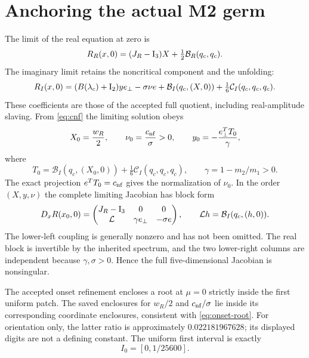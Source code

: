 \documentclass[11pt,a4paper]{article}
\numberwithin{equation}{section}
\begin{document}
\section{Anchoring the actual M2 germ}\label{sec:onset}
The limit of the real equation at zero is
\begin{equation}
R_R(x,0)=(J_R-\mathrm I_3)X+\tfrac12\mathcal B_R(q_c,q_c).\label{eq:onset-real}
\end{equation}
The imaginary limit retains the noncritical component and the unfolding:
\begin{equation}
R_I(x,0)=(B(\lambda_c)+\mathrm I_2)y e_\perp-\sigma\nu e
+\mathcal B_I(q_c,(X,0))+\tfrac16\mathcal C_I(q_c,q_c,q_c).\label{eq:onset-imag}
\end{equation}
These coefficients are those of the accepted full quotient, including real-amplitude slaving. From \eqref{eq:cnf} the limiting solution obeys
\begin{equation}
X_0=\frac{w_R}{2},\qquad
\nu_0=\frac{c_{\rm nf}}{\sigma}>0,\qquad
y_0=-\frac{e_\perp^TT_0}{\gamma},\label{eq:onset-root}
\end{equation}
where
\begin{equation}
T_0=\mathcal B_I(q_c,(X_0,0))+\tfrac16\mathcal C_I(q_c,q_c,q_c),
\qquad\gamma=1-m_2/m_1>0.\label{eq:T0}
\end{equation}
The exact projection $e^TT_0=c_{\rm nf}$ gives the normalization of $\nu_0$. In the order $(X,y,\nu)$ the complete limiting Jacobian has block form
\begin{equation}
D_xR(x_0,0)=
\begin{pmatrix}
J_R-\mathrm I_3 & 0 & 0\\
\mathcal L & \gamma e_\perp & -\sigma e
\end{pmatrix},\qquad
\mathcal L h=\mathcal B_I(q_c,(h,0)).\label{eq:limiting-jacobian}
\end{equation}
The lower-left coupling is generally nonzero and has not been omitted. The real block is invertible by the inherited spectrum, and the two lower-right columns are independent because $\gamma,\sigma>0$. Hence the full five-dimensional Jacobian is nonsingular.

The accepted onset refinement encloses a root at $\mu=0$ strictly inside the first uniform patch. The saved enclosures for $w_R/2$ and $c_{\rm nf}/\sigma$ lie inside its corresponding coordinate enclosures, consistent with \eqref{eq:onset-root}. For orientation only, the latter ratio is approximately $0.022181967628$; its displayed digits are not a defining constant. The uniform first interval is exactly
\begin{equation}
I_0=[0,1/25600].\label{eq:first-patch}
\end{equation}
\end{document}
